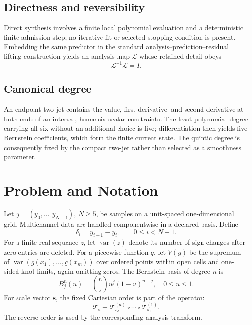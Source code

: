 \documentclass[journal]{IEEEtran}
\newcommand{\Tcal}{\mathcal{T}}
\newcommand{\var}{\operatorname{var}}
\begin{document}
\subsection{Directness and reversibility}

Direct synthesis involves a finite local polynomial evaluation and a
deterministic finite admission step; no iterative fit or selected stopping
condition is present. Embedding the same predictor in the standard
analysis--prediction--residual lifting construction yields an analysis map
\(\mathcal L\) whose retained detail obeys
\begin{equation}
 \mathcal L^{-1}\mathcal L=I.
 \label{eq:reqinverse}
\end{equation}

\subsection{Canonical degree}

An endpoint two-jet contains the value, first derivative, and second
derivative at both ends of an interval, hence six scalar constraints. The
least polynomial degree carrying all six without an additional choice is
five; differentiation then yields five Bernstein coefficients, which form
the finite current state. The quintic degree is consequently fixed by the
compact two-jet rather than selected as a smoothness parameter.

\section{Problem and Notation}

Let \(y=(y_0,\ldots,y_{N-1})\), \(N\geq5\), be samples on a unit-spaced
one-dimensional grid. Multichannel data are handled componentwise in a
declared basis. Define
\begin{equation}
  \delta_i=y_{i+1}-y_i,\qquad 0\leq i<N-1.
  \label{eq:secant}
\end{equation}
For a finite real sequence \(z\), let \(\var(z)\) denote its number of sign
changes after zero entries are deleted. For a piecewise function \(g\), let
\(V(g)\) be the supremum of \(\var(g(x_1),\ldots,g(x_m))\) over ordered
points within open cells and one-sided knot limits, again omitting zeros.
The Bernstein basis of degree \(n\) is
\begin{equation}
  B_j^n(u)=\binom{n}{j}u^j(1-u)^{n-j},\quad 0\leq u\leq1.
  \label{eq:bernstein}
\end{equation}
For scale vector \(\bm s\), the fixed Cartesian order is part of the
operator:
\begin{equation}
  \Tcal_{\bm s}
  =\Tcal_{s_d}^{(d)}\circ\cdots\circ\Tcal_{s_1}^{(1)}.
  \label{eq:product}
\end{equation}
The reverse order is used by the corresponding analysis transform.
\end{document}
